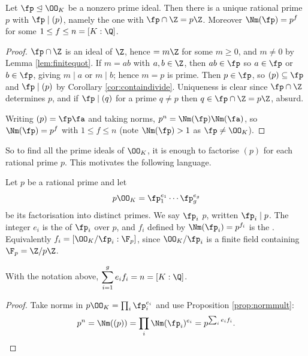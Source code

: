 \begin{lemma}\label{lem:primeabovep}
	Let $\fp \trianglelefteq \OO_K$ be a nonzero prime ideal. Then there is a unique rational prime $p$ with $\fp \mid (p)$, namely the one with $\fp \cap \Z = p\Z$. Moreover $\Nm(\fp) = p^f$ for some $1 \leq f \leq n = [K:\Q]$.
\end{lemma}

\begin{proof}
	$\fp \cap \Z$ is an ideal of $\Z$, hence $= m\Z$ for some $m \geq 0$, and $m \neq 0$ by Lemma \ref{lem:finitequot}. If $m = ab$ with $a,b \in \Z$, then $ab \in \fp$ so $a \in \fp$ or $b \in \fp$, giving $m \mid a$ or $m \mid b$; hence $m = p$ is prime. Then $p \in \fp$, so $(p) \subseteq \fp$ and $\fp \mid (p)$ by Corollary \ref{cor:containdivide}. Uniqueness is clear since $\fp \cap \Z$ determines $p$, and if $\fp \mid (q)$ for a prime $q \neq p$ then $q \in \fp\cap\Z = p\Z$, absurd.

	Writing $(p) = \fp\fa$ and taking norms, $p^n = \Nm(\fp)\Nm(\fa)$, so $\Nm(\fp) = p^f$ with $1 \le f \le n$ (note $\Nm(\fp) > 1$ as $\fp \neq \OO_K$).
\end{proof}

So to find all the prime ideals of $\OO_K$, it is enough to factorise $(p)$ for each rational prime $p$. This motivates the following language.

\begin{definition}
	Let $p$ be a rational prime and let
	$$p\OO_K = \fp_1^{e_1}\cdots\fp_g^{e_g}$$
	be its factorisation into distinct primes. We say $\fp_i$  $p$, written $\fp_i \mid p$. The integer $e_i$ is the  of $\fp_i$ over $p$, and $f_i$ defined by $\Nm(\fp_i) = p^{f_i}$ is the . Equivalently $f_i = [\OO_K/\fp_i : \F_p]$, since $\OO_K/\fp_i$ is a finite field containing $\F_p = \Z/p\Z$.
\end{definition}

\begin{theorem}\label{thm:efg}
	With the notation above, $\displaystyle\sum_{i=1}^g e_if_i = n = [K:\Q]$.
\end{theorem}

\begin{proof}
	Take norms in $p\OO_K = \prod_i\fp_i^{e_i}$ and use Proposition \ref{prop:normmult}:
	$$p^n = \Nm((p)) = \prod_i\Nm(\fp_i)^{e_i} = p^{\sum_i e_if_i}. \qedhere$$
\end{proof}

